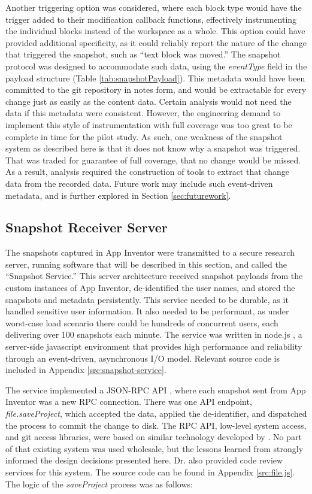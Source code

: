 Another triggering option was considered, where each block type would have the trigger added to their modification callback functions, effectively instrumenting the individual blocks instead of the workspace as a whole. This option could have provided additional specificity, as it could reliably report the nature of the change that triggered the snapshot, such as ``text block was moved.'' The snapshot protocol was designed to accommodate such data, using the \emph{eventType} field in the payload structure (Table \ref{tab:snapshotPayload}). This metadata would have been committed to the git repository in notes form, and would be extractable for every change just as easily as the content data. Certain analysis would not need the data if this metadata were consistent. However, the engineering demand to implement this style of instrumentation with full coverage was too great to be complete in time for the pilot study. As such, one weakness of the snapshot system as described here is that it does not know why a snapshot was triggered. That was traded for guarantee of full coverage, that no change would be missed. As a result, analysis required the construction of tools to extract that change data from the recorded data. Future work may include such event-driven metadata, and is further explored in Section \ref{sec:futurework}.


\subsection{Snapshot Receiver Server}
\label{sec:server}
The snapshots captured in App Inventor were transmitted to a secure research server, running software that will be described in this section, and called the ``Snapshot Service.'' This server architecture received snapshot payloads from the custom instances of App Inventor, de-identified the user names, and stored the snapshots and metadata persistently. This service needed to be durable, as it handled sensitive user information. It also needed to be performant, as under worst-case load scenario there could be hundreds of concurrent users, each delivering over 100 snapshots each minute. The service was written in node.js \citep{nodejs}, a server-side javascript environment that provides high performance and reliability through an event-driven, asynchronous I/O model. Relevant source code is included in Appendix \ref{src:snapshot-service}.

The service implemented a JSON-RPC API \citep{jsonrpc}, where each snapshot sent from App Inventor was a new RPC connection. There was one API endpoint, \emph{file.saveProject}, which accepted the data, applied the de-identifier, and dispatched the process to commit the change to disk. The RPC API, low-level system access, and git access libraries, were based on similar technology developed by \citet{lipman-2011}. No part of that existing system was used wholesale, but the lessons learned from \citet{lipman-2014} strongly informed the design decisions presented here. Dr. \citeauthor{lipman-2014} also provided code review services for this system. The source code can be found in Appendix \ref{src:file.js}. The logic of the \emph{saveProject} process was as follows:

